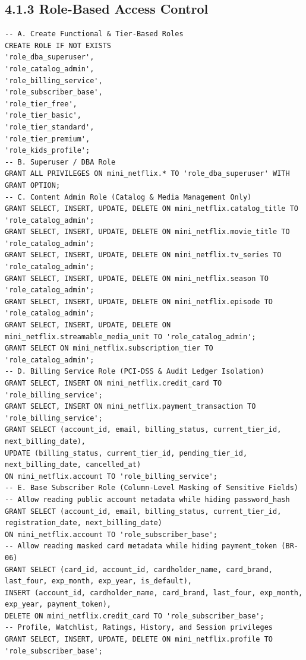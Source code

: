 \subsection*{4.1.3 Role-Based Access Control}

\begin{lstlisting}[style=reportsql,title={Roles and privileges}]
-- A. Create Functional & Tier-Based Roles
CREATE ROLE IF NOT EXISTS
'role_dba_superuser',
'role_catalog_admin',
'role_billing_service',
'role_subscriber_base',
'role_tier_free',
'role_tier_basic',
'role_tier_standard',
'role_tier_premium',
'role_kids_profile';
-- B. Superuser / DBA Role
GRANT ALL PRIVILEGES ON mini_netflix.* TO 'role_dba_superuser' WITH GRANT OPTION;
-- C. Content Admin Role (Catalog & Media Management Only)
GRANT SELECT, INSERT, UPDATE, DELETE ON mini_netflix.catalog_title TO 'role_catalog_admin';
GRANT SELECT, INSERT, UPDATE, DELETE ON mini_netflix.movie_title TO 'role_catalog_admin';
GRANT SELECT, INSERT, UPDATE, DELETE ON mini_netflix.tv_series TO 'role_catalog_admin';
GRANT SELECT, INSERT, UPDATE, DELETE ON mini_netflix.season TO 'role_catalog_admin';
GRANT SELECT, INSERT, UPDATE, DELETE ON mini_netflix.episode TO 'role_catalog_admin';
GRANT SELECT, INSERT, UPDATE, DELETE ON mini_netflix.streamable_media_unit TO 'role_catalog_admin';
GRANT SELECT ON mini_netflix.subscription_tier TO 'role_catalog_admin';
-- D. Billing Service Role (PCI-DSS & Audit Ledger Isolation)
GRANT SELECT, INSERT ON mini_netflix.credit_card TO 'role_billing_service';
GRANT SELECT, INSERT ON mini_netflix.payment_transaction TO 'role_billing_service';
GRANT SELECT (account_id, email, billing_status, current_tier_id, next_billing_date),
UPDATE (billing_status, current_tier_id, pending_tier_id, next_billing_date, cancelled_at)
ON mini_netflix.account TO 'role_billing_service';
-- E. Base Subscriber Role (Column-Level Masking of Sensitive Fields)
-- Allow reading public account metadata while hiding password_hash
GRANT SELECT (account_id, email, billing_status, current_tier_id, registration_date, next_billing_date)
ON mini_netflix.account TO 'role_subscriber_base';
-- Allow reading masked card metadata while hiding payment_token (BR-06)
GRANT SELECT (card_id, account_id, cardholder_name, card_brand, last_four, exp_month, exp_year, is_default),
INSERT (account_id, cardholder_name, card_brand, last_four, exp_month, exp_year, payment_token),
DELETE ON mini_netflix.credit_card TO 'role_subscriber_base';
-- Profile, Watchlist, Ratings, History, and Session privileges
GRANT SELECT, INSERT, UPDATE, DELETE ON mini_netflix.profile TO 'role_subscriber_base';

\end{lstlisting}
